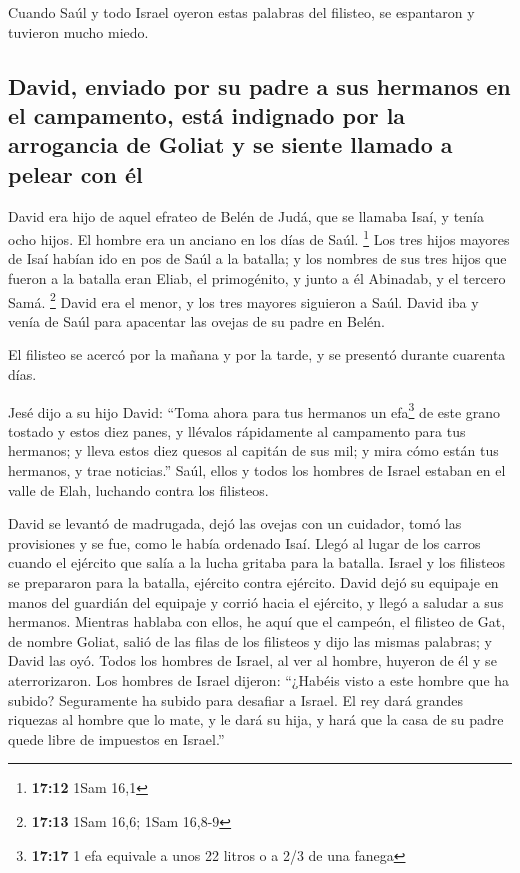 \begin{paracol}{2}
 Cuando Saúl y todo Israel oyeron estas palabras del
filisteo, se espantaron y tuvieron mucho miedo.

\hypertarget{david-enviado-por-su-padre-a-sus-hermanos-en-el-campamento-estuxe1-indignado-por-la-arrogancia-de-goliat-y-se-siente-llamado-a-pelear-con-uxe9l}{%
\subsection{David, enviado por su padre a sus hermanos en el campamento,
está indignado por la arrogancia de Goliat y se siente llamado a pelear
con
él}\label{david-enviado-por-su-padre-a-sus-hermanos-en-el-campamento-estuxe1-indignado-por-la-arrogancia-de-goliat-y-se-siente-llamado-a-pelear-con-uxe9l}}

 David era hijo de aquel efrateo de Belén de Judá, que se
llamaba Isaí, y tenía ocho hijos. El hombre era un anciano en los días
de Saúl. \footnote{\textbf{17:12} 1Sam 16,1}  Los tres
hijos mayores de Isaí habían ido en pos de Saúl a la batalla; y los
nombres de sus tres hijos que fueron a la batalla eran Eliab, el
primogénito, y junto a él Abinadab, y el tercero Samá. \footnote{\textbf{17:13}
  1Sam 16,6; 1Sam 16,8-9}  David era el menor, y los tres
mayores siguieron a Saúl.  David iba y venía de Saúl para
apacentar las ovejas de su padre en Belén.

 El filisteo se acercó por la mañana y por la tarde, y se
presentó durante cuarenta días.

 Jesé dijo a su hijo David: ``Toma ahora para tus
hermanos un efa\footnote{\textbf{17:17} 1 efa equivale a unos 22 litros
  o a 2/3 de una fanega} de este grano tostado y estos diez panes, y
llévalos rápidamente al campamento para tus hermanos;  y
lleva estos diez quesos al capitán de sus mil; y mira cómo están tus
hermanos, y trae noticias.''  Saúl, ellos y todos los
hombres de Israel estaban en el valle de Elah, luchando contra los
filisteos.

 David se levantó de madrugada, dejó las ovejas con un
cuidador, tomó las provisiones y se fue, como le había ordenado Isaí.
Llegó al lugar de los carros cuando el ejército que salía a la lucha
gritaba para la batalla.  Israel y los filisteos se
prepararon para la batalla, ejército contra ejército. 
David dejó su equipaje en manos del guardián del equipaje y corrió hacia
el ejército, y llegó a saludar a sus hermanos.  Mientras
hablaba con ellos, he aquí que el campeón, el filisteo de Gat, de nombre
Goliat, salió de las filas de los filisteos y dijo las mismas palabras;
y David las oyó.  Todos los hombres de Israel, al ver al
hombre, huyeron de él y se aterrorizaron.  Los hombres de
Israel dijeron: ``¿Habéis visto a este hombre que ha subido? Seguramente
ha subido para desafiar a Israel. El rey dará grandes riquezas al hombre
que lo mate, y le dará su hija, y hará que la casa de su padre quede
libre de impuestos en Israel.''


\end{paracol}
